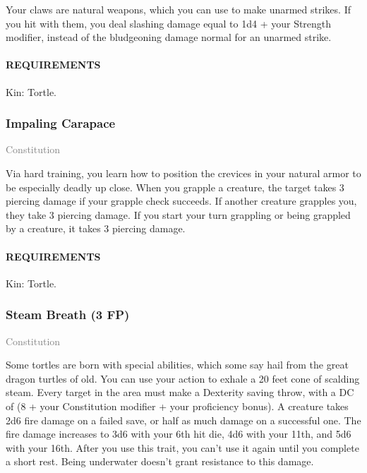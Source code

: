     \normalsize
    Your claws are natural weapons, which you can use to make unarmed strikes.
    If you hit with them, you deal slashing damage equal to 1d4 + your Strength modifier, instead of the bludgeoning damage normal for an unarmed strike.
    \paragraph{REQUIREMENTS} Kin: Tortle.

    \subsubsection{Impaling Carapace} \label{feat::impalingcarapace}
    \small{\textcolor{gray}{Constitution}}

    \normalsize
    Via hard training, you learn how to position the crevices in your natural armor to be especially deadly up close.
    When you grapple a creature, the target takes 3 piercing damage if your grapple check succeeds.
    If another creature grapples you, they take 3 piercing damage.
    If you start your turn grappling or being grappled by a creature, it takes 3 piercing damage.
    \paragraph{REQUIREMENTS} Kin: Tortle.

    \subsubsection{Steam Breath (3 FP)} \label{feat::steambreath}
    \small{\textcolor{gray}{Constitution}}

    \normalsize
    Some tortles are born with special abilities, which some say hail from the great dragon turtles of old.
    You can use your action to exhale a 20 feet cone of scalding steam.
    Every target in the area must make a Dexterity saving throw, with a DC of (8 + your Constitution modifier + your proficiency bonus).
    A creature takes 2d6 fire damage on a failed save, or half as much damage on a successful one.
    The fire damage increases to 3d6 with your 6th hit die, 4d6 with your 11th, and 5d6 with your 16th.
    After you use this trait, you can't use it again until you complete a short rest.
    Being underwater doesn't grant resistance to this damage.

